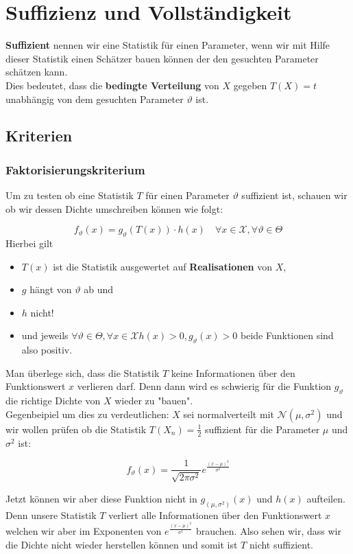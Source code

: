 \documentclass[a4paper]{article}
\begin{document}
\section{Suffizienz und Vollständigkeit}

\textbf{Suffizient} nennen wir eine Statistik für einen Parameter, wenn
wir mit Hilfe dieser Statistik einen Schätzer bauen können der 
den gesuchten Parameter schätzen kann.
\\

Dies bedeutet, dass die \textbf{bedingte Verteilung} von $X$ gegeben
$T(X) = t$ unabhängig von dem gesuchten Parameter $\vartheta$ ist.

\subsection{Kriterien}

\subsubsection{Faktorisierungskriterium}
Um zu testen ob eine Statistik $T$ für einen Parameter $\vartheta$ suffizient
ist, schauen wir ob wir dessen Dichte umschreiben können wie folgt:

\[
	f_\vartheta (x) = g_{\vartheta} \left(
		T(x)
	\right) \cdot h(x) \quad \forall x \in \mathcal{X},
	\forall \vartheta \in \Theta
\] 
Hierbei gilt
\begin{itemize}
	\item $T(x)$ ist die Statistik ausgewertet auf \textbf{Realisationen} von $X$,
	\item $g$ hängt von $\vartheta$ ab und
	\item $h$ nicht!
	\item und jeweils $\forall \vartheta \in \Theta, \forall x \in \mathcal{X} 
		h(x) > 0, g_{\vartheta}(x) > 0$ beide Funktionen sind also
		positiv.
\end{itemize}

Man überlege sich, dass die Statistik $T$ keine Informationen über den
Funktionswert $x$ verlieren darf. Denn dann wird es schwierig für die
Funktion $g_{\vartheta}$ die richtige Dichte von $X$ wieder zu "bauen".
\\

Gegenbeipiel um dies zu verdeutlichen: 
$X$ sei normalverteilt mit $\mathcal{N}(\mu, \sigma ^2)$ und wir wollen
prüfen ob die Statistik $T(X_n) = \frac{ 1 }{ 2 }$ suffizient
für die Parameter $\mu$ und $\sigma ^2$ ist:

\[
	f_\vartheta (x) = \frac{ 1 }{ \sqrt{2\pi \sigma ^2} }
	e ^{ \frac{ (x - \mu) ^2 }{ \sigma ^2 } }
\] 

Jetzt können wir aber diese Funktion nicht in $g_{(\mu, \sigma ^2)} (x)$ und
$h(x)$ aufteilen. Denn unsere Statistik $T$ verliert alle Informationen
über den Funktionswert $x$ welchen wir aber im Exponenten von
$e ^{ \frac{ (x - \mu) ^2 }{ \sigma ^2 } }$
brauchen. Also sehen wir, dass wir die Dichte nicht wieder herstellen
können und somit ist $T$ nicht suffizient.
\end{document}
